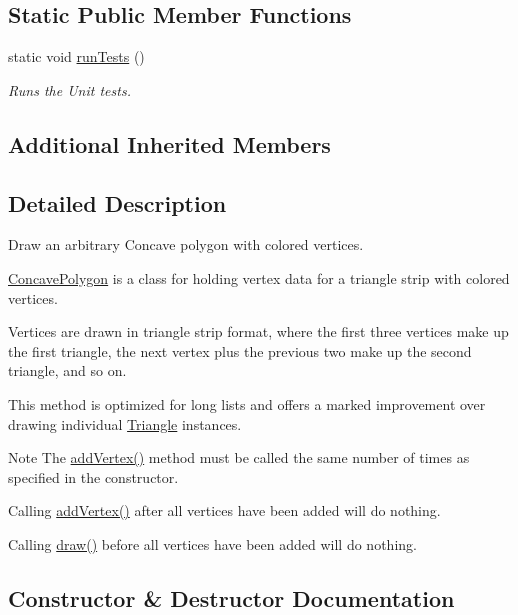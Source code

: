 \subsection*{Static Public Member Functions}
\begin{DoxyCompactItemize}
\item 
static void \hyperlink{classtsgl_1_1_concave_polygon_ace68fa148735bf43d9648cb58a04ac46}{run\+Tests} ()
\begin{DoxyCompactList}\small\item\em Runs the Unit tests. \end{DoxyCompactList}\end{DoxyCompactItemize}
\subsection*{Additional Inherited Members}


\subsection{Detailed Description}
Draw an arbitrary Concave polygon with colored vertices. 

\hyperlink{classtsgl_1_1_concave_polygon}{Concave\+Polygon} is a class for holding vertex data for a triangle strip with colored vertices.

Vertices are drawn in triangle strip format, where the first three vertices make up the first triangle, the next vertex plus the previous two make up the second triangle, and so on.

This method is optimized for long lists and offers a marked improvement over drawing individual \hyperlink{classtsgl_1_1_triangle}{Triangle} instances. \begin{DoxyNote}{Note}
The \hyperlink{classtsgl_1_1_concave_polygon_ae2675ff0bf54cc7092a9ab3418dcab30}{add\+Vertex()} method must be called the same number of times as specified in the constructor. 

Calling \hyperlink{classtsgl_1_1_concave_polygon_ae2675ff0bf54cc7092a9ab3418dcab30}{add\+Vertex()} after all vertices have been added will do nothing. 

Calling \hyperlink{classtsgl_1_1_concave_polygon_a06d759932483ae2b54bb807db20cbc4a}{draw()} before all vertices have been added will do nothing. 
\end{DoxyNote}


\subsection{Constructor \& Destructor Documentation}
\hypertarget{classtsgl_1_1_concave_polygon_a1bb43589a1a992f14111e6a7157f0d7a}{}

